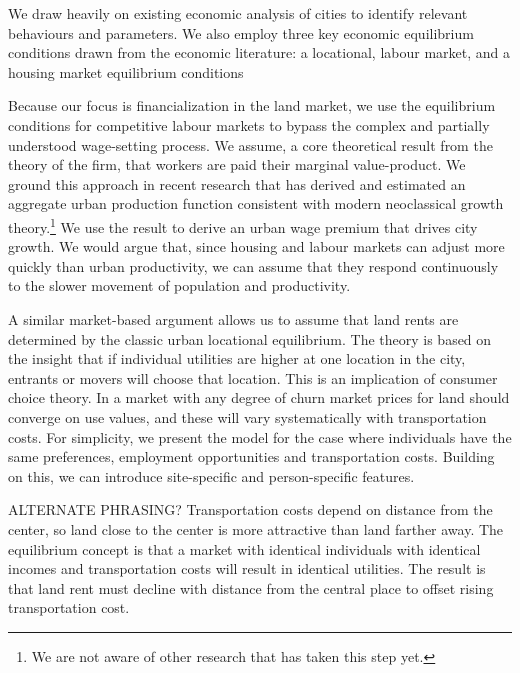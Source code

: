 
We draw heavily on existing economic analysis of cities to identify relevant behaviours and parameters. We also employ three key economic equilibrium conditions drawn from the economic literature: a locational, labour market, and a housing market equilibrium conditions

Because our focus is financialization in the land market, we use the equilibrium conditions for competitive labour markets to bypass the complex and partially understood wage-setting process. We assume, a core theoretical result from the theory of the firm, that workers are paid their \gls{marginal value-product}. We ground this approach in recent research that has derived and estimated an aggregate urban production function consistent with modern \gls{neoclassical growth theory}.\footnote{We are not aware of other research that has taken this step yet.} We use the result to derive an urban wage premium that drives city growth. We would argue that, since housing and labour markets can adjust more quickly than urban productivity, we can assume that they respond  continuously to the slower movement of population and productivity. %

A similar market-based argument allows us to assume that land rents are determined by the classic urban locational equilibrium. The theory is based on the insight that if individual utilities are higher at one location in the city, entrants or movers will choose that  location. This is an implication of consumer choice theory. In a market with any degree of churn market prices for land should converge on use values, and these will vary systematically with transportation costs. For simplicity, we present the model for the case where individuals have the same preferences, employment opportunities and transportation costs. Building on this, %
we can introduce site-specific and person-specific features. 

ALTERNATE PHRASING? Transportation costs depend on distance from the center, so land close to the center is more attractive than land farther away.  The equilibrium concept is that a market with identical individuals with identical incomes and transportation costs will result in identical utilities. The result is that land rent must decline with distance from the central place to offset rising transportation cost. 

